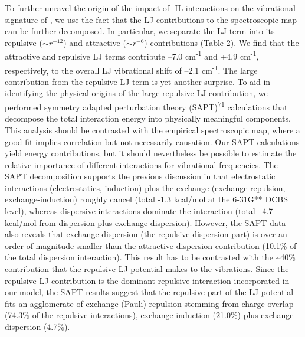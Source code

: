 \documentclass[]{article}
\begin{document}
To further unravel the origin of the impact of -IL interactions on the vibrational signature of , we use the fact that the LJ contributions to the spectroscopic map can be further decomposed. In particular, we separate the LJ term into its repulsive (\({\sim r}^{- 12}\)) and attractive (\(\sim r^{- 6}\)) contributions (Table 2). We find that the attractive and repulsive LJ terms contribute --7.0 cm\textsuperscript{-1} and +4.9 cm\textsuperscript{-1}, respectively, to the overall LJ vibrational shift of --2.1 cm\textsuperscript{-1}. The large contribution from the repulsive LJ term is yet another surprise. To aid in identifying the physical origins of the large repulsive LJ contribution, we performed symmetry adapted perturbation theory (SAPT)\textsuperscript{71} calculations that decompose the total interaction energy into physically meaningful components. This analysis should be contrasted with the empirical spectroscopic map, where a good fit implies correlation but not necessarily causation. Our SAPT calculations yield energy contributions, but it should nevertheless be possible to estimate the relative importance of different interactions for vibrational frequencies. The SAPT decomposition supports the previous discussion in that electrostatic interactions (electrostatics, induction) plus the exchange (exchange repulsion, exchange-induction) roughly cancel (total ‑1.3 kcal/mol at the 6-31G** DCBS level), whereas dispersive interactions dominate the interaction (total ­--4.7 kcal/mol from dispersion plus exchange-dispersion). However, the SAPT data also reveals that exchange-dispersion (the repulsive dispersion part) is over an order of magnitude smaller than the attractive dispersion contribution (10.1\% of the total dispersion interaction). This result has to be contrasted with the \textasciitilde{}40\% contribution that the repulsive LJ potential makes to the vibrations. Since the repulsive LJ contribution is the dominant repulsive interaction incorporated in our model, the SAPT results suggest that the repulsive part of the LJ potential fits an agglomerate of exchange (Pauli) repulsion stemming from charge overlap (74.3\% of the repulsive interactions), exchange induction (21.0\%) plus exchange dispersion (4.7\%).
\end{document}
